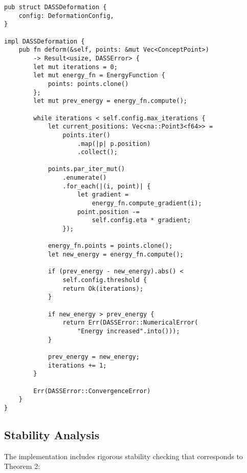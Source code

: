 \documentclass{article}
\begin{document}
\begin{verbatim}
pub struct DASSDeformation {
    config: DeformationConfig,
}

impl DASSDeformation {
    pub fn deform(&self, points: &mut Vec<ConceptPoint>) 
        -> Result<usize, DASSError> {
        let mut iterations = 0;
        let mut energy_fn = EnergyFunction { 
            points: points.clone() 
        };
        let mut prev_energy = energy_fn.compute();
        
        while iterations < self.config.max_iterations {
            let current_positions: Vec<na::Point3<f64>> = 
                points.iter()
                    .map(|p| p.position)
                    .collect();
            
            points.par_iter_mut()
                .enumerate()
                .for_each(|(i, point)| {
                    let gradient = 
                        energy_fn.compute_gradient(i);
                    point.position -= 
                        self.config.eta * gradient;
                });
            
            energy_fn.points = points.clone();
            let new_energy = energy_fn.compute();
            
            if (prev_energy - new_energy).abs() < 
                self.config.threshold {
                return Ok(iterations);
            }
            
            if new_energy > prev_energy {
                return Err(DASSError::NumericalError(
                    "Energy increased".into()));
            }
            
            prev_energy = new_energy;
            iterations += 1;
        }
        
        Err(DASSError::ConvergenceError)
    }
}
\end{verbatim}

\subsection{Stability Analysis}
The implementation includes rigorous stability checking that corresponds to Theorem 2:
\end{document}
